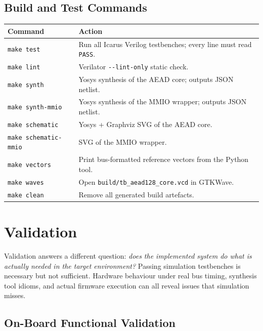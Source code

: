 \documentclass[11pt,a4paper]{article}
\newcommand{\thead}[1]{\cellcolor{tabhead}\color{white}\textbf{\small #1}}
\begin{document}
\subsection{Build and Test Commands}

\begin{tabular}{@{}lL{10cm}@{}}
  \toprule
  \thead{Command} & \thead{Action} \\
  \midrule
  \texttt{make test}           & Run all Icarus Verilog testbenches; every line must read \texttt{PASS}. \\
  \texttt{make lint}           & Verilator \texttt{-{}-lint-only} static check. \\
  \texttt{make synth}          & Yosys synthesis of the AEAD core; outputs JSON netlist. \\
  \texttt{make synth-mmio}     & Yosys synthesis of the MMIO wrapper; outputs JSON netlist. \\
  \texttt{make schematic}      & Yosys + Graphviz SVG of the AEAD core. \\
  \texttt{make schematic-mmio} & SVG of the MMIO wrapper. \\
  \texttt{make vectors}        & Print bus-formatted reference vectors from the Python tool. \\
  \texttt{make waves}          & Open \texttt{build/tb\_aead128\_core.vcd} in GTKWave. \\
  \texttt{make clean}          & Remove all generated build artefacts. \\
  \bottomrule
\end{tabular}

\section{Validation}
\label{sec:validation}

Validation answers a different question: \textit{does the implemented
system do what is actually needed in the target environment?} Passing
simulation testbenches is necessary but not sufficient. Hardware behaviour
under real bus timing, synthesis tool idioms, and actual firmware execution
can all reveal issues that simulation misses.

\subsection{On-Board Functional Validation}
\end{document}
